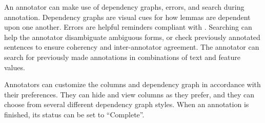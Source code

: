 An annotator can make use of dependency graphs, errors, and search during annotation.
Dependency graphs are visual cues for how lemmas are dependent upon one another.
Errors are helpful reminders compliant with \ud.
Searching can help the annotator disambiguate ambiguous forms, or check previously annotated sentences to ensure coherency and inter-annotator agreement.
The annotator can search for previously made annotations in combinations of text and feature values.

Annotators can customize the columns and dependency graph in accordance with their preferences.
They can hide and view columns as they prefer, and they can choose from several different dependency graph styles.
When an annotation is finished, its status can be set to ``Complete''.
